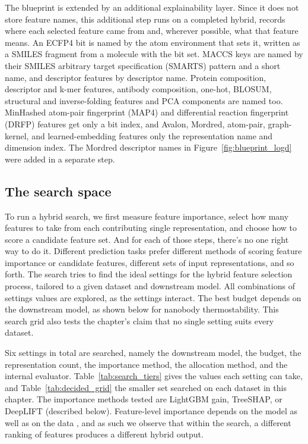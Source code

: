 The blueprint is extended by an additional explainability layer. Since it does not store feature names, this additional step runs on a completed hybrid, records where each selected feature came from and, wherever possible, what that feature means. An ECFP4 bit is named by the atom environment that sets it, written as a SMILES fragment from a molecule with the bit set. MACCS keys are named by their SMILES arbitrary target specification (SMARTS) pattern and a short name, and descriptor features by descriptor name. Protein composition, descriptor and k-mer features, antibody composition, one-hot, BLOSUM, structural and inverse-folding features and PCA components are named too. MinHashed atom-pair fingerprint (MAP4) and differential reaction fingerprint (DRFP) features get only a bit index, and Avalon, Mordred, atom-pair, graph-kernel, and learned-embedding features only the representation name and dimension index. The Mordred descriptor names in Figure~\ref{fig:blueprint_logd} were added in a separate step.

\subsection{The search space}\label{sec:method:searchspace}
To run a hybrid search, we first measure feature importance, select how many features to take from each contributing single representation, and choose how to score a candidate feature set. And for each of those steps, there's no one right way to do it. Different prediction tasks prefer different methods of scoring feature importance or candidate features, different sets of input representations, and so forth. The search tries to find the ideal settings for the hybrid feature selection process, tailored to a given dataset and downstream model. All combinations of settings values are explored, as the settings interact. The best budget depends on the downstream model, as shown below for nanobody thermostability. This search grid also tests the chapter's claim that no single setting suits every dataset.

Six settings in total are searched, namely the downstream model, the budget, the representation count, the importance method, the allocation method, and the internal evaluator. Table~\ref{tab:search_tiers} gives the values each setting can take, and Table~\ref{tab:decided_grid} the smaller set searched on each dataset in this chapter. The importance methods tested are LightGBM gain, TreeSHAP, or DeepLIFT (described below). Feature-level importance depends on the model as well as on the data \citep{Dong2020}, and as such we observe that within the search, a different ranking of features produces a different hybrid output.

